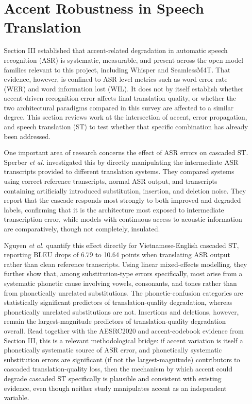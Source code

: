 \section{Accent Robustness in Speech Translation}
\label{sec:accent-st}

Section III established that accent-related degradation in automatic speech recognition (ASR) is systematic, measurable, and present across the open model families relevant to this project, including Whisper and SeamlessM4T. That evidence, however, is confined to ASR-level metrics such as word error rate (WER) and word information lost (WIL). It does not by itself establish whether accent-driven recognition error affects final translation quality, or whether the two architectural paradigms compared in this survey are affected to a similar degree. This section reviews work at the intersection of accent, error propagation, and speech translation (ST) to test whether that specific combination has already been addressed.

One important area of research concerns the effect of ASR errors on cascaded ST. Sperber \textit{et al.} \cite{sperber2019} investigated this by directly manipulating the intermediate ASR transcripts provided to different translation systems. They compared systems using correct reference transcripts, normal ASR output, and transcripts containing artificially introduced substitution, insertion, and deletion noise. They report that the cascade responds most strongly to both improved and degraded labels, confirming that it is the architecture most exposed to intermediate transcription error, while models with continuous access to acoustic information are comparatively, though not completely, insulated.

Nguyen \textit{et al.} \cite{pida2026} quantify this effect directly for Vietnamese-English cascaded ST, reporting BLEU drops of 6.79 to 10.64 points when translating ASR output rather than clean reference transcripts. Using linear mixed-effects modelling, they further show that, among substitution-type errors specifically, most arise from a systematic phonetic cause involving vowels, consonants, and tones rather than from phonetically unrelated substitutions. The phonetic-confusion categories are statistically significant predictors of translation-quality degradation, whereas phonetically unrelated substitutions are not. Insertions and deletions, however, remain the largest-magnitude predictors of translation-quality degradation overall. Read together with the AESRC2020 and accent-codebook evidence from Section III, this is a relevant methodological bridge: if accent variation is itself a phonetically systematic source of ASR error, and phonetically systematic substitution errors are significant (if not the largest-magnitude) contributors to cascaded translation-quality loss, then the mechanism by which accent could degrade cascaded ST specifically is plausible and consistent with existing evidence, even though neither study manipulates accent as an independent variable.

